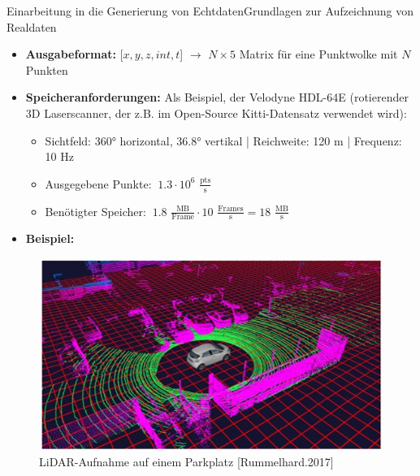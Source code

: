 \documentclass[169, handout	]{THIbeamer} %
\begin{document}
	\begin{frame}{Einarbeitung in die Generierung von Echtdaten}{Grundlagen zur Aufzeichnung von Realdaten}
		\begin{itemize}
			\item \textbf{Ausgabeformat:} [$x, y, z, int, t$] $\rightarrow$ $N \times 5$ Matrix für eine Punktwolke mit $N$ Punkten
			\item \textbf{Speicheranforderungen:} Als Beispiel, der Velodyne HDL-64E (rotierender 3D Laserscanner, der z.B. im  Open-Source Kitti-Datensatz verwendet wird):
			\begin{itemize}
				\item Sichtfeld: 360° horizontal, 36.8° vertikal | Reichweite: 120 m | Frequenz: 10 Hz
				\item Ausgegebene Punkte: $~ 1.3 \cdot 10^{6}$ $\frac{\text{pts}}{\text{s}}$ 
				\item Benötigter Speicher: $~1.8$ $\frac{\text{MB}}{\text{Frame}} \cdot 10$ $\frac{\text{Frames}}{\text{s}} = 18$  $\frac{\text{MB}}{\text{s}}$
			\end{itemize}			 
			\item \textbf{Beispiel:}
		\end{itemize}					
		\begin{figure}
			\includegraphics[scale=0.3]{required/LiDAR auf Parkplatz.jpg}
			\caption{LiDAR-Aufnahme auf einem Parkplatz [Rummelhard.2017]}
		\end{figure}
	\end{frame}
\end{document}
